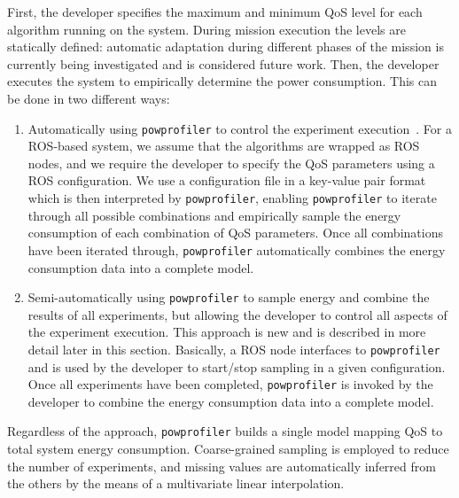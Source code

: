 \documentclass[conference, onecolumn, draftclsnofoot]{IEEEtran}
\newcommand{\stt}[1]{{\small\tt #1}} %
\newcommand{\powprof}{\stt{powprofiler}}
\begin{document}

First, the developer specifies the maximum and minimum QoS level for
each algorithm running on the system.  During mission execution the
levels are statically defined: automatic adaptation during different
phases of the mission is currently being investigated and is
considered future work.
%
Then, the developer executes the system to empirically determine the
power consumption. This can be done in two different ways:
%
\begin{enumerate}
\item Automatically using \powprof{} to control the experiment
  execution~\cite{seewald2019coarse}. For a ROS-based system, we assume that the algorithms
  are wrapped as ROS nodes, and we require the developer to specify
  the QoS parameters using a ROS configuration. We use a configuration
  file in a key-value pair format which is then interpreted by
  \powprof{}, enabling \powprof{} to iterate through all possible
  combinations and empirically sample the energy consumption of each
  combination of QoS parameters. Once all combinations have been
  iterated through, \powprof{} automatically combines the energy
  consumption data into a complete model.
\item Semi-automatically using \powprof{} to sample energy and combine
  the results of all experiments, but allowing the developer to
  control all aspects of the experiment execution. This approach is
  new and is described in more detail later in this
  section. Basically, a ROS node interfaces to \powprof{} and is used
  by the developer to start/stop sampling in a given
  configuration. Once all experiments have been completed, \powprof{} is
  invoked by the developer to combine the energy consumption data into
  a complete model.


\end{enumerate}
%
Regardless of the approach, \powprof{} builds a single model mapping
QoS to total system energy consumption. Coarse-grained sampling is
employed to reduce the number of experiments, and missing values are
automatically inferred from the others by the means of a multivariate
linear interpolation.
\end{document}
